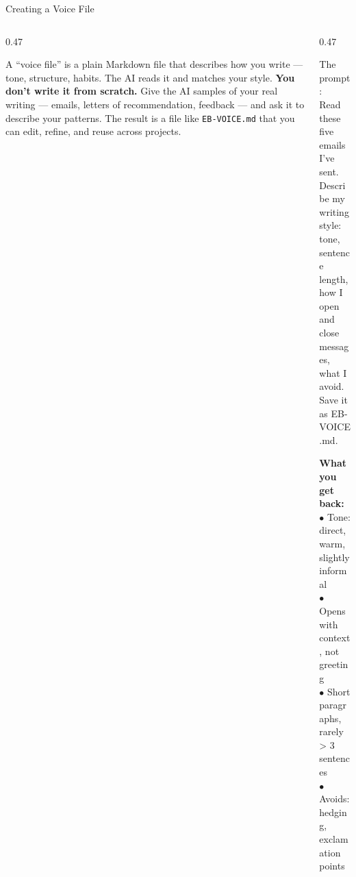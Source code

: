\documentclass[aspectratio=169, 10pt]{beamer}
\begin{document}
\begin{frame}{Creating a Voice File}
\begin{columns}[T]
\begin{column}{0.47\textwidth}
\begin{tcolorbox}[accentbox]
\small
A ``voice file'' is a plain Markdown file that describes how you write --- tone, structure, habits. The AI reads it and matches your style.
\vskip4pt
\textbf{You don't write it from scratch.} Give the AI samples of your real writing --- emails, letters of recommendation, feedback --- and ask it to describe your patterns.
\vskip4pt
The result is a file like \texttt{EB-VOICE.md} that you can edit, refine, and reuse across projects.
\end{tcolorbox}
\end{column}
\begin{column}{0.47\textwidth}
\begin{tcolorbox}[colback=DarkSlate, colframe=DarkSlate, arc=3pt, left=6pt, right=6pt, top=4pt, bottom=4pt]
{\color{CoolGray}\ttfamily\tiny The prompt:\\[2pt]
\color{white}\scriptsize
Read these five emails I've sent.\\
Describe my writing style: tone,\\
sentence length, how I open and\\
close messages, what I avoid.\\
Save it as EB-VOICE.md.
}
\end{tcolorbox}
\vskip3pt
\begin{tcolorbox}[quotebox, top=3pt, bottom=3pt]
\small
\textbf{What you get back:}\\[2pt]
{\scriptsize $\bullet$ Tone: direct, warm, slightly informal\\
$\bullet$ Opens with context, not greeting\\
$\bullet$ Short paragraphs, rarely > 3 sentences\\
$\bullet$ Avoids: hedging, exclamation points}
\end{tcolorbox}
\end{column}
\end{columns}
\end{frame}
\end{document}
